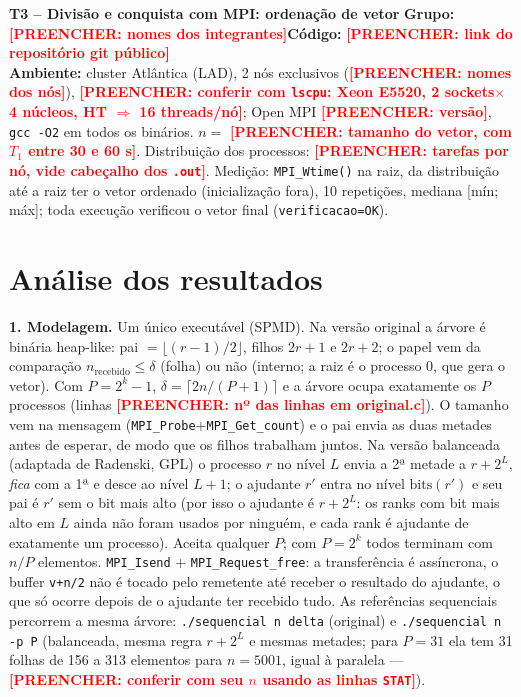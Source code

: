\documentclass[10pt,a4paper]{article}
\newcommand{\TODO}[1]{\textcolor{red}{\textbf{[PREENCHER: #1]}}}
\begin{document}
{\large\textbf{T3 -- Divisão e conquista com MPI: ordenação de vetor}}\hfill
\textbf{Grupo:} \TODO{nomes dos integrantes}\hfill \textbf{Código:} \TODO{link do repositório git público}\\[2pt]
\small
\textbf{Ambiente:} cluster Atlântica (LAD), 2 nós exclusivos (\TODO{nomes dos nós}), \TODO{conferir com \texttt{lscpu}: Xeon E5520, 2 sockets$\times$4 núcleos, HT $\Rightarrow$ 16 threads/nó}; Open MPI \TODO{versão}, \texttt{gcc -O2} em todos os binários. $n=$ \TODO{tamanho do vetor, com $T_1$ entre 30 e 60 s}. Distribuição dos processos: \TODO{tarefas por nó, vide cabeçalho dos \texttt{.out}}. Medição: \texttt{MPI\_Wtime()} na raiz, da distribuição até a raiz ter o vetor ordenado (inicialização fora), 10 repetições, mediana [mín; máx]; toda execução verificou o vetor final (\texttt{verificacao=OK}).

\section*{Análise dos resultados}
\textbf{1. Modelagem.} Um único executável (SPMD). Na versão original a árvore é binária heap-like: pai $=\lfloor(r-1)/2\rfloor$, filhos $2r+1$ e $2r+2$; o papel vem da comparação $n_{\mathrm{recebido}}\le\delta$ (folha) ou não (interno; a raiz é o processo 0, que gera o vetor). Com $P=2^k-1$, $\delta=\lceil 2n/(P+1)\rceil$ e a árvore ocupa exatamente os $P$ processos (linhas \TODO{nº das linhas em original.c}). O tamanho vem na mensagem (\texttt{MPI\_Probe}+\texttt{MPI\_Get\_count}) e o pai envia as duas metades antes de esperar, de modo que os filhos trabalham juntos. Na versão balanceada (adaptada de Radenski, GPL) o processo $r$ no nível $L$ envia a 2ª metade a $r+2^L$, \emph{fica} com a 1ª e desce ao nível $L+1$; o ajudante $r'$ entra no nível $\mathrm{bits}(r')$ e seu pai é $r'$ sem o bit mais alto (por isso o ajudante é $r+2^L$: os ranks com bit mais alto em $L$ ainda não foram usados por ninguém, e cada rank é ajudante de exatamente um processo). Aceita qualquer $P$; com $P=2^k$ todos terminam com $n/P$ elementos. \texttt{MPI\_Isend} + \texttt{MPI\_Request\_free}: a transferência é assíncrona, o buffer \texttt{v+n/2} não é tocado pelo remetente até receber o resultado do ajudante, o que só ocorre depois de o ajudante ter recebido tudo. As referências sequenciais percorrem a mesma árvore: \texttt{./sequencial n delta} (original) e \texttt{./sequencial n -p P} (balanceada, mesma regra $r+2^L$ e mesmas metades; para $P=31$ ela tem 31 folhas de 156 a 313 elementos para $n=5001$, igual à paralela --- \TODO{conferir com seu $n$ usando as linhas \texttt{STAT}}).
\end{document}
